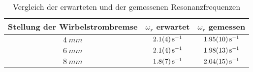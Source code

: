 \begin{table}[!htbp]
\centering
\begin{tabular}{|c|c|c|}
\hline 
Stellung der Wirbelstrombremse & $\omega_r$ erwartet & $\omega_r$ gemessen \\ 
\hline 
$\SI{4}{mm}$ & $\SI{2.1\pm0.4}{\per\second}$ & $\SI{1.95\pm0.10}{\per\second}$ \\ 
\hline 
$\SI{6}{mm}$ & $\SI{2.1\pm0.4}{\per\second}$ & $\SI{1.98\pm0.13}{\per\second}$ \\ 
\hline 
$\SI{8}{mm}$ & $\SI{1.8\pm0.7}{\per\second}$ & $\SI{2.04\pm0.15}{\per\second}$ \\ 
\hline 
\end{tabular} 
\caption{\small{Vergleich der erwarteten und der gemessenen Resonanzfrequenzen}}
\label{tab:2}
\end{table}
\newpage